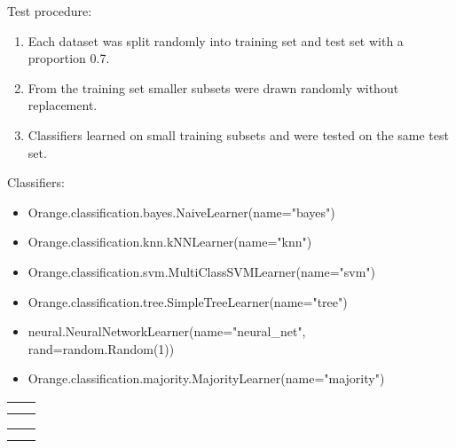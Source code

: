 \documentclass[a4paper]{article}
\begin{document}
Test procedure:
\begin{enumerate}
\item Each dataset was split randomly into training set and test set with a proportion 0.7.
\item From the training set smaller subsets were drawn randomly without replacement.
\item Classifiers learned on small training subsets and were tested on the same test set.
\end{enumerate}

Classifiers:
\begin{itemize}
\item Orange.classification.bayes.NaiveLearner(name="bayes")
\item Orange.classification.knn.kNNLearner(name="knn")
\item Orange.classification.svm.MultiClassSVMLearner(name="svm")
\item Orange.classification.tree.SimpleTreeLearner(name="tree")
\item neural.NeuralNetworkLearner(name="neural\_net", rand=random.Random(1))
\item Orange.classification.majority.MajorityLearner(name="majority")
\end{itemize}

\begin{landscape}
\begin{tabular}{cc}
 & \\
 & \\
\end{tabular}
\newpage
\begin{tabular}{cc}
 & \\
 & \\
\end{tabular}
\end{landscape}
\restoregeometry
\end{document}
